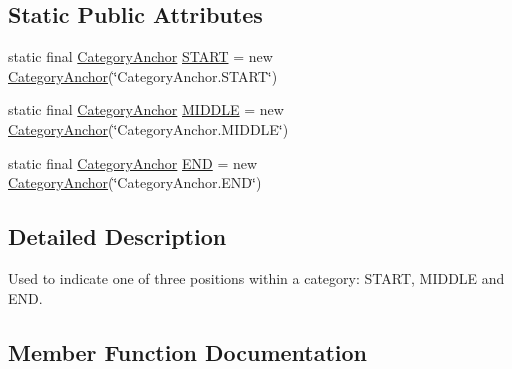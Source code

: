 \subsection*{Static Public Attributes}
\begin{DoxyCompactItemize}
\item 
static final \mbox{\hyperlink{classorg_1_1jfree_1_1chart_1_1axis_1_1_category_anchor}{Category\+Anchor}} \mbox{\hyperlink{classorg_1_1jfree_1_1chart_1_1axis_1_1_category_anchor_ae465435cffa5a3e0f3991eb50a57b8f5}{S\+T\+A\+RT}} = new \mbox{\hyperlink{classorg_1_1jfree_1_1chart_1_1axis_1_1_category_anchor}{Category\+Anchor}}(\char`\"{}Category\+Anchor.\+S\+T\+A\+RT\char`\"{})
\item 
static final \mbox{\hyperlink{classorg_1_1jfree_1_1chart_1_1axis_1_1_category_anchor}{Category\+Anchor}} \mbox{\hyperlink{classorg_1_1jfree_1_1chart_1_1axis_1_1_category_anchor_af23cb27a981eec0513b4bb16645818cf}{M\+I\+D\+D\+LE}} = new \mbox{\hyperlink{classorg_1_1jfree_1_1chart_1_1axis_1_1_category_anchor}{Category\+Anchor}}(\char`\"{}Category\+Anchor.\+M\+I\+D\+D\+LE\char`\"{})
\item 
static final \mbox{\hyperlink{classorg_1_1jfree_1_1chart_1_1axis_1_1_category_anchor}{Category\+Anchor}} \mbox{\hyperlink{classorg_1_1jfree_1_1chart_1_1axis_1_1_category_anchor_a38b7ab23b41abe03e4be8b24035ada9c}{E\+ND}} = new \mbox{\hyperlink{classorg_1_1jfree_1_1chart_1_1axis_1_1_category_anchor}{Category\+Anchor}}(\char`\"{}Category\+Anchor.\+E\+ND\char`\"{})
\end{DoxyCompactItemize}


\subsection{Detailed Description}
Used to indicate one of three positions within a category\+: {\ttfamily S\+T\+A\+RT}, {\ttfamily M\+I\+D\+D\+LE} and {\ttfamily E\+ND}. 

\subsection{Member Function Documentation}
\mbox{\label{classorg_1_1jfree_1_1chart_1_1axis_1_1_category_anchor_a41e20c57f7105a7d5067fa12a9db0df8}} 
